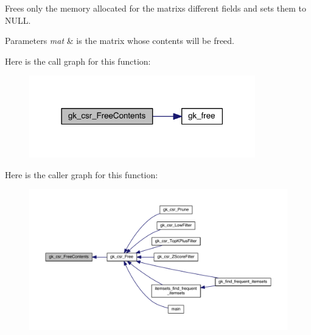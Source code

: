 Frees only the memory allocated for the matrix\textquotesingle{}s different fields and sets them to N\+U\+LL. 
\begin{DoxyParams}{Parameters}
{\em mat} & is the matrix whose contents will be freed. \\
\hline
\end{DoxyParams}
Here is the call graph for this function\+:\nopagebreak
\begin{figure}[H]
\begin{center}
\leavevmode
\includegraphics[width=278pt]{a00023_a9646f29b0605ba264bf373c441a6826d_cgraph}
\end{center}
\end{figure}
Here is the caller graph for this function\+:\nopagebreak
\begin{figure}[H]
\begin{center}
\leavevmode
\includegraphics[width=350pt]{a00023_a9646f29b0605ba264bf373c441a6826d_icgraph}
\end{center}
\end{figure}
\mbox{\label{a00023_a601a4baa00acee0a9c446a4c6f5ac394}} 
